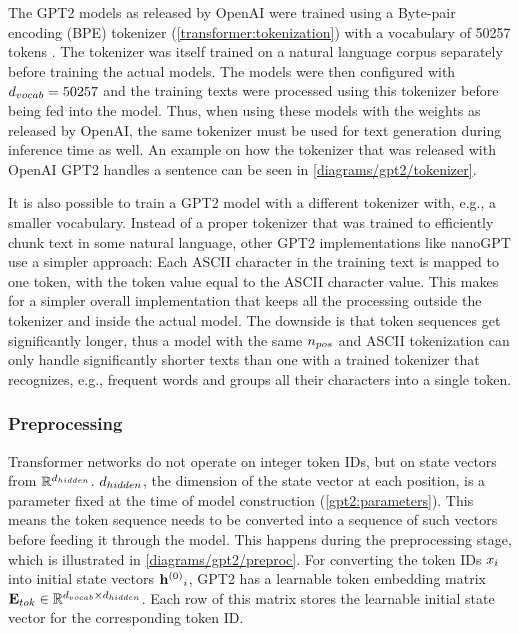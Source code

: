 \label{gpt2:tokenizer}

The GPT2 models as released by OpenAI were trained using a Byte-pair encoding (BPE) tokenizer (\cref{transformer:tokenization}) with a vocabulary of 50257 tokens  \cite{HuggingFaceGPT2}. The tokenizer was itself trained on a natural language corpus separately before training the actual models. The models were then configured with ${d_{vocab}}=50257$ and the training texts were processed using this tokenizer before being fed into the model. Thus, when using these models with the weights as released by OpenAI, the same tokenizer must be used for text generation during inference time as well. An example on how the tokenizer that was released with OpenAI GPT2 handles a sentence can be seen in \cref{diagrams/gpt2/tokenizer}.

It is also possible to train a GPT2 model with a different tokenizer with, e.g., a smaller vocabulary. Instead of a proper tokenizer that was trained to efficiently chunk text in some natural language, other GPT2 implementations like nanoGPT \cite{nanogpt} use a simpler approach: Each ASCII character in the training text is mapped to one token, with the token value equal to the ASCII character value.
This makes for a simpler overall implementation that keeps all the processing outside the tokenizer and inside the actual model.
The downside is that token sequences get significantly longer, thus a model with the same ${n_{pos}}$ and ASCII tokenization can only handle significantly shorter texts than one with a trained tokenizer that recognizes, e.g., frequent words and groups all their characters into a single token.



\subsubsection{Preprocessing}
\label{gpt2_preproc}

Transformer networks do not operate on integer token IDs, but on state vectors from $\mathbb{R}^{{d_{hidden}}}$. ${d_{hidden}}$, the dimension of the state vector at each position, is a parameter fixed at the time of model construction (\cref{gpt2:parameters}).
This means the token sequence needs to be converted into a sequence of such vectors before feeding it through the model. This happens during the preprocessing stage, which is illustrated in \cref{diagrams/gpt2/preproc}.
For converting the token IDs ${x}_i$ into initial state vectors ${\mathbf{h}^{(0)}}_i$, GPT2 has a learnable token embedding matrix ${\mathbf{E}_{tok}} \in \mathbb{R}^{{d_{vocab}} \times {d_{hidden}}}$. Each row of this matrix stores the learnable initial state vector for the corresponding token ID.



